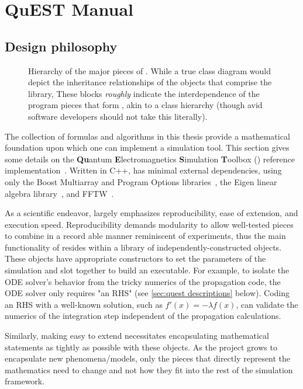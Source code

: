 \chapter{QuEST Manual}

\section{Design philosophy}

\begin{figure}
  \centering
  \caption{\label{fig:hierarchy}Hierarchy of the major pieces of \QuEST{}.
    While a true class diagram would depict the inheritance relationships of the objects that comprise the \QuEST{} library, 
  These blocks \emph{roughly} indicate the interdependence of the program pieces that form \QuEST{}, akin to a class hierarchy (though avid software developers should not take this literally).}
\end{figure}

The collection of formulas and algorithms in this thesis provide a mathematical foundation upon which one can implement a simulation tool. This section gives some details on the \textbf{Qu}antum \textbf{E}lectromagnetics \textbf{S}imulation \textbf{T}oolbox (\QuEST{}) reference implementation~\cite{github}. Written in C++, \QuEST{} has minimal external dependencies, using only the Boost Multiarray and Program Options libraries~\cite{boost}, the Eigen linear algebra library~\cite{eigen}, and FFTW~\cite{FFTW}.

As a scientific endeavor, \QuEST{} largely emphasizes reproducibility, ease of extension, and execution speed.
Reproducibility demands modularity to allow well-tested pieces to combine in a record able manner reminiscent of experiments, thus the main functionality of \QuEST{} resides within a library of independently-constructed objects.
These objects have appropriate constructors to set the parameters of the simulation and slot together to build an executable.
For example, to isolate the ODE solver's behavior from the tricky numerics of the propagation code, the ODE solver only requires "an RHS" (see \cref{sec:quest descriptions} below).
Coding an RHS with a well-known solution, such as $f'(x) = - \lambda f(x)$, can validate the numerics of the integration step independent of the propagation calculations.

Similarly, making \QuEST{} easy to extend necessitates encapsulating mathematical statements as tightly as possible with these objects.
As the project grows to encapsulate new phenomena/models, only the pieces that directly represent the mathematics need to change and not how they fit into the rest of the simulation framework.

